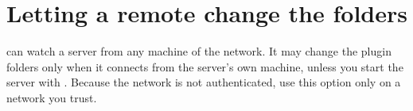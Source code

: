\section{Letting a remote  change the folders}
\label{sec:admin}

 can watch a server from any machine of the network. It may
change the plugin folders only when it connects from the server's own
machine, unless you start the server with . Because the
network is not authenticated, use this option only on a network you
trust.

